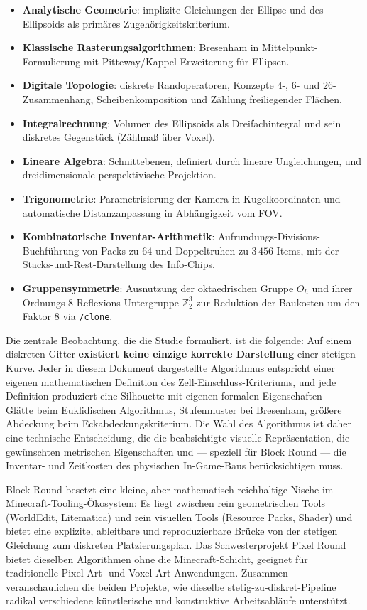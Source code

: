 \documentclass[12pt,a4paper]{scrartcl}
\newcommand{\acc}[1]{\textcolor{accent}{\textbf{#1}}}
\newcommand{\cmd}[1]{\textcolor{earth}{\texttt{\small #1}}}
\begin{document}
\begin{itemize}[leftmargin=1.3em,itemsep=0.25em,topsep=0.4em]
  \item \acc{Analytische Geometrie}: implizite Gleichungen der Ellipse und des Ellipsoids als primäres Zugehörigkeitskriterium.
  \item \acc{Klassische Rasterungsalgorithmen}: Bresenham in Mittelpunkt-Formulierung mit Pitteway/Kappel-Erweiterung für Ellipsen.
  \item \acc{Digitale Topologie}: diskrete Randoperatoren, Konzepte 4-, 6- und 26-Zusammenhang, Scheibenkomposition und Zählung freiliegender Flächen.
  \item \acc{Integralrechnung}: Volumen des Ellipsoids als Dreifachintegral und sein diskretes Gegenstück (Zählmaß über Voxel).
  \item \acc{Lineare Algebra}: Schnittebenen, definiert durch lineare Ungleichungen, und dreidimensionale perspektivische Projektion.
  \item \acc{Trigonometrie}: Parametrisierung der Kamera in Kugelkoordinaten und automatische Distanzanpassung in Abhängigkeit vom FOV.
  \item \acc{Kombinatorische Inventar-Arithmetik}: Aufrundungs-Divisions-Buchführung von Packs zu $64$ und Doppeltruhen zu $3\,456$ Items, mit der Stacks-und-Rest-Darstellung des Info-Chips.
  \item \acc{Gruppensymmetrie}: Ausnutzung der oktaedrischen Gruppe $O_h$ und ihrer Ordnungs-$8$-Reflexions-Untergruppe $\mathbb{Z}_2^3$ zur Reduktion der Baukosten um den Faktor $8$ via \cmd{/clone}.
\end{itemize}

Die zentrale Beobachtung, die die Studie formuliert, ist die folgende: Auf einem diskreten Gitter \acc{existiert keine einzige korrekte Darstellung} einer stetigen Kurve. Jeder in diesem Dokument dargestellte Algorithmus entspricht einer eigenen mathematischen Definition des Zell-Einschluss-Kriteriums, und jede Definition produziert eine Silhouette mit eigenen formalen Eigenschaften --- Glätte beim Euklidischen Algorithmus, Stufenmuster bei Bresenham, größere Abdeckung beim Eckabdeckungskriterium. Die Wahl des Algorithmus ist daher eine technische Entscheidung, die die beabsichtigte visuelle Repräsentation, die gewünschten metrischen Eigenschaften und --- speziell für Block Round --- die Inventar- und Zeitkosten des physischen In-Game-Baus berücksichtigen muss.

Block Round besetzt eine kleine, aber mathematisch reichhaltige Nische im Minecraft-Tooling-Ökosystem: Es liegt zwischen rein geometrischen Tools (WorldEdit, Litematica) und rein visuellen Tools (Resource Packs, Shader) und bietet eine explizite, ableitbare und reproduzierbare Brücke von der stetigen Gleichung zum diskreten Platzierungsplan. Das Schwesterprojekt Pixel Round bietet dieselben Algorithmen ohne die Minecraft-Schicht, geeignet für traditionelle Pixel-Art- und Voxel-Art-Anwendungen. Zusammen veranschaulichen die beiden Projekte, wie dieselbe stetig-zu-diskret-Pipeline radikal verschiedene künstlerische und konstruktive Arbeitsabläufe unterstützt.
\end{document}
